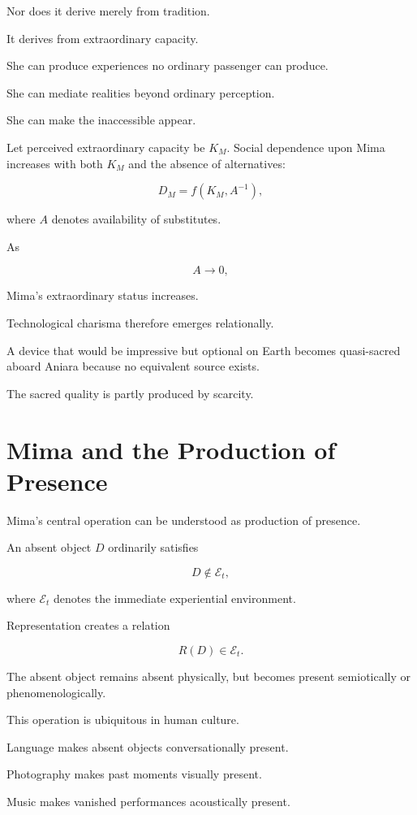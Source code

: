 \documentclass[11pt,oneside]{book}
\theoremstyle{definition}
\theoremstyle{remark}
\begin{document}
Nor does it derive merely from tradition.

It derives from extraordinary capacity.

She can produce experiences no ordinary passenger can produce.

She can mediate realities beyond ordinary perception.

She can make the inaccessible appear.

Let perceived extraordinary capacity be \(K_M\). Social dependence upon Mima increases with both \(K_M\) and the absence of alternatives:

\[
D_M
=
f(K_M,A^{-1}),
\]

where \(A\) denotes availability of substitutes.

As

\[
A\rightarrow0,
\]

Mima's extraordinary status increases.

Technological charisma therefore emerges relationally.

A device that would be impressive but optional on Earth becomes quasi-sacred aboard Aniara because no equivalent source exists.

The sacred quality is partly produced by scarcity.

\section{Mima and the Production of Presence}

Mima's central operation can be understood as production of presence.

An absent object \(D\) ordinarily satisfies

\[
D\notin\mathcal E_t,
\]

where \(\mathcal E_t\) denotes the immediate experiential environment.

Representation creates a relation

\[
R(D)\in\mathcal E_t.
\]

The absent object remains absent physically, but becomes present semiotically or phenomenologically.

This operation is ubiquitous in human culture.

Language makes absent objects conversationally present.

Photography makes past moments visually present.

Music makes vanished performances acoustically present.
\end{document}
